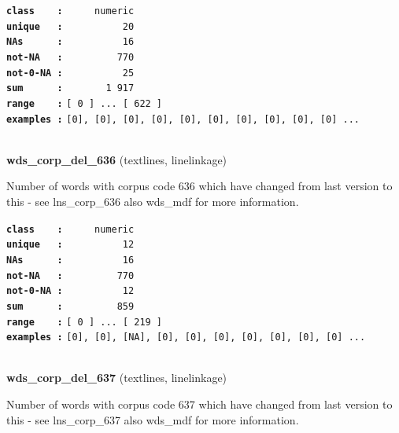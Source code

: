 \documentclass[]{article}
\begin{document}
\textbf{\texttt{class\ \ \ \ :}} \texttt{~~~~~numeric}\\
\textbf{\texttt{unique\ \ \ :}} \texttt{~~~~~~~~~~20}\\
\textbf{\texttt{NAs\ \ \ \ \ \ :}} \texttt{~~~~~~~~~~16}\\
\textbf{\texttt{not-NA\ \ \ :}} \texttt{~~~~~~~~~770}\\
\textbf{\texttt{not-0-NA\ :}} \texttt{~~~~~~~~~~25}\\
\textbf{\texttt{sum\ \ \ \ \ \ :}} \texttt{~~~~~~~1~917}\\
\textbf{\texttt{range\ \ \ \ :}}
\texttt{{[}\ 0\ {]}\ ...\ {[}\ 622\ {]}}\\
\textbf{\texttt{examples\ :}}
\texttt{{[}0{]},\ {[}0{]},\ {[}0{]},\ {[}0{]},\ {[}0{]},\ {[}0{]},\ {[}0{]},\ {[}0{]},\ {[}0{]},\ {[}0{]}\ ...}\\

~

\textbf{wds\_corp\_del\_636} (textlines, linelinkage)

Number of words with corpus code 636 which have changed from last
version to this - see lns\_corp\_636 also wds\_mdf for more information.

\textbf{\texttt{class\ \ \ \ :}} \texttt{~~~~~numeric}\\
\textbf{\texttt{unique\ \ \ :}} \texttt{~~~~~~~~~~12}\\
\textbf{\texttt{NAs\ \ \ \ \ \ :}} \texttt{~~~~~~~~~~16}\\
\textbf{\texttt{not-NA\ \ \ :}} \texttt{~~~~~~~~~770}\\
\textbf{\texttt{not-0-NA\ :}} \texttt{~~~~~~~~~~12}\\
\textbf{\texttt{sum\ \ \ \ \ \ :}} \texttt{~~~~~~~~~859}\\
\textbf{\texttt{range\ \ \ \ :}}
\texttt{{[}\ 0\ {]}\ ...\ {[}\ 219\ {]}}\\
\textbf{\texttt{examples\ :}}
\texttt{{[}0{]},\ {[}0{]},\ {[}NA{]},\ {[}0{]},\ {[}0{]},\ {[}0{]},\ {[}0{]},\ {[}0{]},\ {[}0{]},\ {[}0{]}\ ...}\\

~

\textbf{wds\_corp\_del\_637} (textlines, linelinkage)

Number of words with corpus code 637 which have changed from last
version to this - see lns\_corp\_637 also wds\_mdf for more information.
\end{document}
